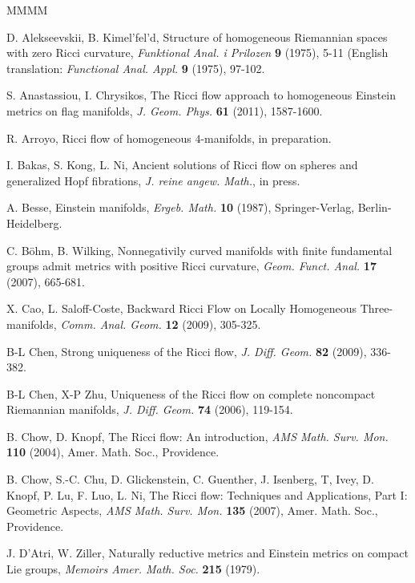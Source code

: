 \documentclass[11pt]{amsart}
\theoremstyle{plain}
\theoremstyle{definition}
\theoremstyle{remark}
\begin{document}
\begin{thebibliography}{MMMM}

 {\sc D. Alekseevskii, B. Kimel'fel'd},
Structure of homogeneous Riemannian spaces with zero Ricci curvature,
{\it Funktional Anal. i Prilozen} {\bf 9} (1975), 5-11
(English translation: {\it Functional Anal. Appl.} {\bf 9} (1975), 97-102.

 {\sc S. Anastassiou, I. Chrysikos}, The Ricci flow approach to homogeneous Einstein metrics on flag manifolds,
{\it J. Geom. Phys.} {\bf 61} (2011), 1587-1600.

 {\sc R. Arroyo}, Ricci flow of homogeneous $4$-manifolds, in preparation.

 {\sc I. Bakas, S. Kong, L. Ni}, Ancient solutions of Ricci flow on spheres and generalized Hopf fibrations, {\it J. reine angew. Math.}, in press.

 {\sc A. Besse}, Einstein manifolds, {\it Ergeb. Math.} {\bf 10} (1987), Springer-Verlag,
Berlin-Heidelberg.

 {\sc C. B\"ohm, B. Wilking}, Nonnegativily curved manifolds with finite fundamental groups admit metrics with positive Ricci curvature, {\it Geom. Funct. Anal.} {\bf 17} (2007), 665-681.

 {\sc X. Cao,  L. Saloff-Coste}, Backward Ricci Flow on Locally Homogeneous Three-manifolds,
{\it Comm. Anal. Geom.} {\bf 12} (2009), 305-325.

 {\sc B-L Chen}, Strong uniqueness of the Ricci flow, {\it J. Diff. Geom.} {\bf 82} (2009), 336-382.

 {\sc B-L Chen, X-P Zhu}, Uniqueness of the Ricci flow on complete noncompact Riemannian manifolds, {\it J. Diff. Geom.} {\bf 74} (2006), 119-154.

  {\sc B. Chow, D. Knopf}, The Ricci flow: An introduction, {\it AMS Math. Surv. Mon.}
{\bf 110} (2004), Amer. Math. Soc., Providence.

  {\sc B. Chow, S.-C. Chu, D. Glickenstein, C.
Guenther, J. Isenberg, T, Ivey, D. Knopf, P. Lu, F. Luo, L. Ni}, The Ricci flow:
Techniques and Applications, Part I: Geometric Aspects, {\it AMS Math. Surv. Mon.}
{\bf 135} (2007), Amer. Math. Soc., Providence.

 {\sc J. D'Atri, W. Ziller},  Naturally reductive metrics and Einstein metrics on compact Lie groups, {\it Memoirs Amer. Math. Soc.} {\bf 215} (1979).


\end{thebibliography}
\end{document}
